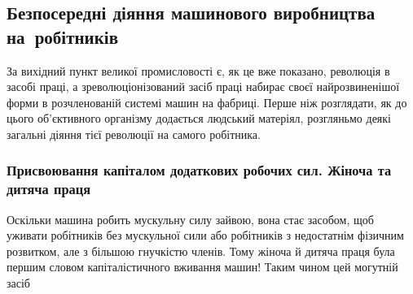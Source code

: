 \vspace{-\medskipamount}
\vspace{-\smallskipamount}
\subsection{Безпосередні діяння машинового виробництва на~робітників}
\vspace{-\medskipamount}

За вихідний пункт великої промисловості є, як це вже
показано, революція в засобі праці, а зреволюціонізований засіб
праці набирає своєї найрозвиненішої форми в розчленованій
системі машин на фабриці. Перше ніж розглядати, як до цього
об’єктивного організму додається людський матеріял, розгляньмо
деякі загальні діяння тієї революції на самого робітника.

\vspace{-\medskipamount}
\vspace{-\smallskipamount}
\subsubsection{Присвоювання капіталом додаткових робочих
сил. Жіноча та дитяча праця}
\vspace{-\medskipamount}

Оскільки машина робить мускульну силу зайвою, вона стає
засобом, щоб уживати робітників без мускульної сили або робітників
з недостатнім фізичним розвитком, але з більшою гнучкістю
членів. Тому жіноча й дитяча праця була першим словом капіталістичного
вживання машин! Таким чином цей могутній засіб
\parbreak{}  %
